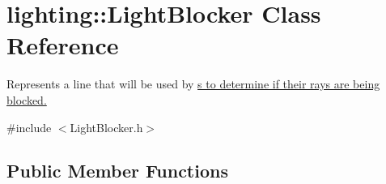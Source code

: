 \hypertarget{classlighting_1_1LightBlocker}{}\section{lighting\+:\+:Light\+Blocker Class Reference}
\label{classlighting_1_1LightBlocker}


Represents a line that will be used by \hyperlink{classlighting_1_1LightSource}{s to determine if their rays are being blocked. }  




{\ttfamily \#include $<$Light\+Blocker.\+h$>$}

\subsection*{Public Member Functions}
